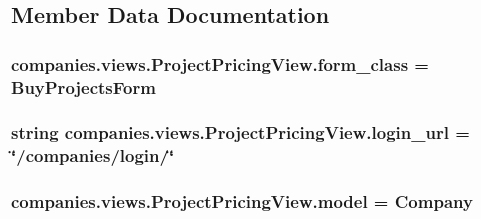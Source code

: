 \subsection{Member Data Documentation}
\hypertarget{classcompanies_1_1views_1_1_project_pricing_view_a2122dd5ba11f1cb27a4c87087a29ee5e}{
\subsubsection[{form\-\_\-class}]{\setlength{\rightskip}{0pt plus 5cm}companies.\-views.\-Project\-Pricing\-View.\-form\-\_\-class = Buy\-Projects\-Form\hspace{0.3cm}{\ttfamily [static]}}}\label{classcompanies_1_1views_1_1_project_pricing_view_a2122dd5ba11f1cb27a4c87087a29ee5e}
\hypertarget{classcompanies_1_1views_1_1_project_pricing_view_a4ffe00eab2fef7cd56485e34d60a0c65}{
\subsubsection[{login\-\_\-url}]{\setlength{\rightskip}{0pt plus 5cm}string companies.\-views.\-Project\-Pricing\-View.\-login\-\_\-url = \char`\"{}/companies/login/\char`\"{}\hspace{0.3cm}{\ttfamily [static]}}}\label{classcompanies_1_1views_1_1_project_pricing_view_a4ffe00eab2fef7cd56485e34d60a0c65}
\hypertarget{classcompanies_1_1views_1_1_project_pricing_view_a48f57d591511570a1c97a9a1cc626595}{
\subsubsection[{model}]{\setlength{\rightskip}{0pt plus 5cm}companies.\-views.\-Project\-Pricing\-View.\-model = Company\hspace{0.3cm}{\ttfamily [static]}}}\label{classcompanies_1_1views_1_1_project_pricing_view_a48f57d591511570a1c97a9a1cc626595}
